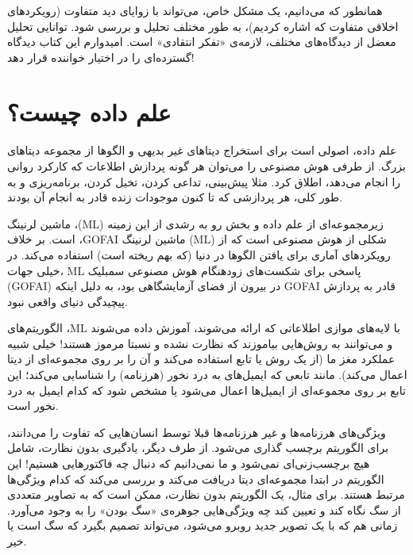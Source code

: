 \documentclass[12pt,oneside]{book}
\begin{document}
    همانطور که می‌دانیم، یک مشکل خاص، می‌تواند با زوایای دید متفاوت (رویکردهای اخلاقی متفاوت که اشاره کردیم)، به طور مختلف تحلیل و بررسی شود.
    توانایی تحلیل معضل از دیدگاه‌های مختلف، لازمه‌ی «تفکر انتقادی» است.
    امیدوارم این کتاب دیدگاه گسترده‌ای را در اختیار خواننده قرار دهد!

    \newpage

    \section{علم داده چیست؟}
    \paragraph{}
    علم داده، اصولی است برای استخراج دیتاهای غیر بدیهی و الگوها از مجموعه دیتاهای بزرگ.
    از طرفی هوش مصنوعی را می‌توان هر گونه پردازش اطلاعات که کارکرد روانی را انجام می‌دهد، اطلاق کرد.
    مثلا پیش‌بینی، تداعی کردن، تخیل کردن، برنامه‌ریزی و به طور کلی، هر پردازشی که تا کنون موجودات زنده قادر به انجام آن بودند.

    ماشین لرنینگ ،(ML) زیرمجموعه‌ای از علم داده و بخش رو به رشدی از این زمینه است.
    بر خلاف ،GOFAI ماشین لرنینگ (ML) شکلی از هوش مصنوعی است که از رویکردهای آماری برای یافتن الگوها در دنیا (که بهم ریخته است) استفاده می‌کند.
    در خیلی جهات، ML پاسخی برای شکست‌های زودهنگام هوش مصنوعی سمبلیک (GOFAI) در بیرون از فضای آزمایشگاهی بود، به دلیل اینکه GOFAI قادر به پردازش پیچیدگی دنیای واقعی نبود.

    الگوریتم‌های ،ML با لایه‌های موازی اطلاعاتی که ارائه می‌شوند، آموزش داده می‌شوند و می‌توانند به روش‌هایی بیاموزند که نظارت نشده و نسبتا مرموز هستند!
    خیلی شبیه عملکرد مغز ما (از یک روش یا تابع استفاده می‌کند و آن را بر روی مجموعه‌ای از دیتا اعمال می‌کند).
    مانند تابعی که ایمیل‌های به درد نخور (هرزنامه) را شناسایی می‌کند؛ این تابع بر روی مجموعه‌ای از ایمیل‌ها اعمال می‌شود یا مشخص شود که کدام ایمیل به درد نخور است.

    ویژگی‌های هرزنامه‌ها و غیر هرزنامه‌ها قبلا توسط انسان‌هایی که تفاوت را می‌دانند، برای الگوریتم برچسب گذاری می‌شود.
    از طرف دیگر، یادگیری بدون نظارت، شامل هیچ برچسب‌زنی‌ای نمی‌شود و ما نمی‌دانیم که دنبال چه فاکتورهایی هستیم!
    این الگوریتم در ابتدا مجموعه‌ای دیتا دریافت می‌کند و بررسی می‌کند که کدام ویژگی‌ها مرتبط هستند.
    برای مثال، یک الگوریتم بدون نظارت، ممکن است که به تصاویر متعددی از سگ نگاه کند و تعیین کند چه ویژگی‌هایی جوهره‌ی «سگ بودن» را به وجود می‌آورد.
    زمانی هم که با یک تصویر جدید روبرو می‌شود، می‌تواند تصمیم بگیرد که سگ است یا خیر.
\end{document}
